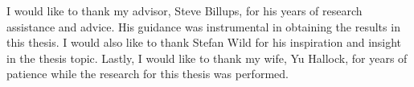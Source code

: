 I would like to thank my advisor, Steve Billups, for his years of research assistance and advice. 
His guidance was instrumental in obtaining the results in this thesis. 
I would also like to thank Stefan Wild for his inspiration and insight in the thesis topic. 
Lastly, I would like to thank my wife, Yu Hallock, for years of patience while the research for this thesis was performed.
